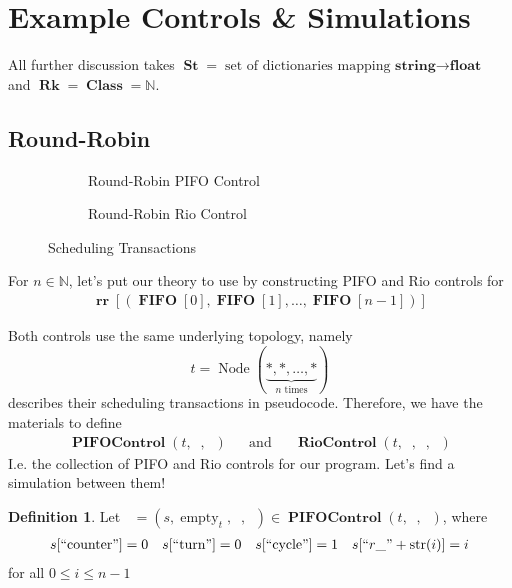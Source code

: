 \documentclass{amsart}
\DeclareMathOperator{\Rk}{\mathbf{Rk}}
\DeclareMathOperator{\Node}{\mathrm{Node}}
\DeclareMathOperator{\St}{\mathbf{St}}
\DeclareMathOperator{\RR}{\mathbf{rr}}     %
\DeclareMathOperator{\Class}{\mathbf{Class}}
\DeclareMathOperator{\FIFO}{\mathbf{FIFO}}
\DeclareMathOperator{\PIFOControl}{\mathbf{PIFOControl}}
\DeclareMathOperator{\RioControl}{\mathbf{RioControl}}
\DeclareMathOperator{\zprepush}{z_{\mathrm{pre-push}}}
\DeclareMathOperator{\zpostpop}{z_{\mathrm{post-pop}}}
\DeclareMathOperator{\tzprepush}{z^{\prime}_{\mathrm{pre-push}}}
\DeclareMathOperator{\tzprepop}{z^{\prime}_{\mathrm{pre-pop}}}
\DeclareMathOperator{\tzpostpop}{z^{\prime}_{\mathrm{post-pop}}}
\DeclareMathOperator{\crr}{c_{\text{RR}}}
\DeclareMathOperator{\emt}{\mathrm{empty}}
\theoremstyle{definition}
\newtheorem{dfn}[thm]{Definition}
\begin{document}
\newpage

\section{Example Controls \& Simulations}

All further discussion takes $\St = \text{set of dictionaries mapping $\textbf{string} \to \textbf{float}$}$ and $\Rk = \Class = \mathbb N$.

\subsection{Round-Robin}

\begin{figure}[!htb]
    \centering
    \begin{subfigure}[t]{0.49\linewidth}
        
        
        \caption{Round-Robin PIFO Control}
        \label{fig:rr-pifo-ctrl}
    \end{subfigure}
    \begin{subfigure}[t]{0.49\linewidth}
        
        
        
        \caption{Round-Robin Rio Control}
        \label{fig:rr-rio-ctrl}
    \end{subfigure}
    \caption{Scheduling Transactions}
    \label{fig:sched_trans}
\end{figure}

For $n \in \mathbb N$, let's put our theory to use by constructing PIFO and Rio controls for
\begin{align*}
    \RR[(\FIFO[0], \FIFO[1], \ldots, \FIFO[n - 1])] 
\end{align*}

Both controls use the same underlying topology, namely
$$
t = \Node(\underbrace{\ast, \ast, \ldots, \ast}_{n \text{ times}})
$$
 describes their scheduling transactions in pseudocode.
Therefore, we have the materials to define
\begin{align*}
    \PIFOControl(t, \zprepush, \zpostpop)
    &&
    \text{and}
    &&
    \RioControl(t, \tzprepush, \tzprepop, \tzpostpop)
\end{align*}
I.e. the collection of PIFO and Rio controls for our program.
Let's find a simulation between them!

\begin{dfn}
    \label{dfn:rrinit}
    Let $\crr = (s, \emt_t, \zprepush, \zpostpop) \in \PIFOControl(t, \zprepush, \zpostpop)$, where
    \begin{align*}
        s[``\text{counter}"] = 0 &&
        s[``\text{turn}"] = 0 &&
        s[``\text{cycle}"] = 1 &&
        s[``r\_" + \text{str}(i)] = i 
    \end{align*}
    for all $0 \leq i \leq n - 1$
\end{dfn}
\end{document}
